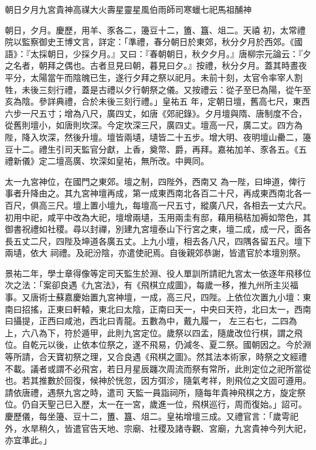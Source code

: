 
\begin{pinyinscope}

 朝日夕月九宮貴神高禖大火壽星靈星風伯雨師司寒蠟七祀馬祖酺神



 朝日，夕月。慶歷，用羊、豕各二，籩豆十二，簠、簋、俎二。天禧
 初，太常禮院以監察御史王博文言，詳定：「準禮，春分朝日於東郊，秋分夕月於西郊。《國語》：『太採朝日，少採夕月。』又曰：『春朝朝日，秋夕夕月。』唐柳宗元論云：『夕之名者，朝拜之偶也。古者旦見曰朝，暮見曰夕。』按禮，秋分夕月。蓋其時晝夜平分，太陽當午而陰魄已生，遂行夕拜之祭以祀月。未前十刻，太官令率宰人割牲，未後三刻行禮，蓋是古禮以夕行朝祭之儀。又按禮云：從子至巳為陽，從午至亥為陰。參詳典禮，合於未後三刻行禮。」皇祐五
 年，定朝日壇，舊高七尺，東西六步一尺五寸；增為八尺，廣四丈，如唐《郊祀錄》。夕月壇與隋、唐制度不合，從舊則壇小，如唐則坎深。今定坎深三尺，廣四丈。壇高一尺，廣二丈。四方為陛，降入坎深，然後升壇。壇皆兩壝，壝皆二十五步。增大明、夜明壇山罍二，籩豆十二。禮生引司天監官分獻，上香，奠幣、爵，再拜。嘉祐加羊、豕各五。《五禮新儀》定二壇高廣、坎深如皇祐，無所改。中興同。



 太一九宮神位，在國門之東郊。壇之制，四陛外，西南又
 為一陛，曰坤道，俾行事者升降由之。其九宮神壇再成，第一成東西南北各百二十尺，再成東西南北各一百尺，俱高三尺。壇上置小壇九，每壇高一尺五寸，縱廣八尺，各相去一丈六尺。初用中祀，咸平中改為大祀，壇增兩壝，玉用兩圭有邸，藉用稿秸加褥如幣色，其御書祝禮如社稷。尋以封禪，別建九宮壇泰山下行宮之東，壇二成，成一尺，面各長五丈二尺，四陛及坤道各廣五丈。上九小壇，相去各八尺，四隅各留五尺。壇下兩壝，依大
 祠禮。及祀汾陰，亦遣使祀焉。自後親郊恭謝，皆遣官於本壇別祭。



 景祐二年，學士章得像等定司天監生於淵、役人單訓所請祀九宮太一依逐年飛移位次之法：「案卻良遇《九宮法》，有《飛棋立成圖》，每歲一移，推九州所主災福事。又唐術士蘇嘉慶始置九宮神壇，一成，高三尺，四陛。上依位次置九小壇：東南曰招搖，正東曰軒轅，東北曰太陰，正南曰天一，中央曰天符，北曰太一，西南曰攝提，正西曰咸池，西北曰青龍。五數為中，戴九履一，
 左三右七，二四為上，六八為下，符於遁甲，此則九宮定位。歲祭以四孟，隨歲改位行棋，謂之飛位。自乾元以後，止依本位祭之，遂不飛易，仍減冬、夏二祭。國朝因之。今於淵等所請，合天寶初祭之理，又合良遇《飛棋之圖》。然其法本術家，時祭之文經禮不載。議者或謂不必飛宮，若日月星辰躔次周流而祭有常所，此則定位之祀所當從也。若其推數於回復，候神於恍忽，因方弭沴，隨氣考祥，則飛位之文固可遵用。請依唐禮，遇祭九宮之時，遣司
 天監一員詣祠所，隨每年貴神飛棋之方，旋定祭位。仍自天聖己巳入歷，太一在一宮，歲進一位，飛棋巡行，周而復始。」詔可。慶歷儀，每坐籩、豆十二，簠、簋、俎二。皇祐增壇三成。又禮官言：「歲雩祀外，水旱稍久，皆遣官告天地、宗廟、社稷及諸寺觀、宮廟，九宮貴神今列大祀，亦宜準此。」




\end{pinyinscope}
